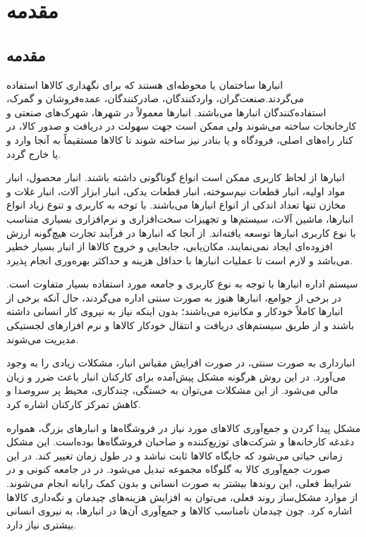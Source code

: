 \chapter{مقدمه}
\section{مقدمه}
انبارها ساختمان یا محوطه‌ای هستند که برای نگهداری کالاها استفاده می‌گردند.صنعت‌گران، واردکنندگان، صادرکنندگان، عمده‌فروشان و گمرک، استفاده‌کنندگان انبارها می‌باشند. انبارها معمولاً در شهرها، شهرک‌های صنعتی و کارخانجات ساخته می‌شوند ولی ممکن است جهت سهولت در دریافت و صدور کالا، در کنار راه‌های اصلی، فرودگاه و یا بنادر نیز ساخته شوند تا کالاها مستقیماً به آنجا وارد و یا خارج گردد.

انبار‌ها از لحاظ کاربری ممکن است انواع گوناگونی داشته باشند. انبار محصول، انبار مواد اولیه، انبار قطعات نیم‌سوخته، انبار قطعات یدکی، انبار ابزار آلات، انبار غلات و مخازن تنها تعداد اندکی از انواع انبارها می‌باشند. با توجه به کاربری و تنوع زیاد انواع انبارها، ماشین آلات، سیستم‌ها و تجهیزات سخت‌افزاری و نرم‌افزاری بسیاری متناسب با نوع کاربری انبارها توسعه یافته‌اند. از آنجا که انبارها در فرآیند تجارت هیچ‌گونه ارزش افزوده‌ای ایجاد نمی‌نمایند، مکان‌یابی، جابجایی و خروج کالاها از انبار بسیار خطیر می‌باشد و لازم است تا عملیات انبارها با حداقل هزینه و حداکثر بهره‌وری انجام پذیرد.

سیستم اداره انبارها با توجه به نوع کاربری و جامعه مورد استفاده بسیار متفاوت است. در برخی از جوامع، انبارها هنوز به صورت سنتی اداره می‌گردند، حال آنکه برخی از انبارها کاملاً خودکار و مکانیزه می‌باشند؛ بدون اینکه نیاز به نیروی کار انسانی داشته باشند و از طریق سیستم‌های دریافت و انتقال خودکار کالاها و نرم افزارهای لجستیکی مدیریت می‌شوند.

انبارداری به صورت سنتی، در صورت افزایش مقیاس انبار، مشکلات زیادی را به وجود می‌آورد. در این روش هرگونه مشکل پیش‌آمده برای کارکنان انبار باعث ضرر و زیان مالی می‌شود. از این مشکلات می‌توان به خستگی، چندکاری، محیط پر سروصدا و کاهش تمرکز کارکنان اشاره کرد.
 
 
مشکل پیدا کردن و جمع‌آوری کالاهای مورد نیاز در فروشگاه‌ها و انبارهای بزرگ، همواره دغدغه کارخانه‌ها و شرکت‌های توزیع‌کننده و صاحبان فروشگاه‌ها بوده‌است. این مشکل زمانی حیاتی می‌شود که جایگاه کالاها ثابت نباشد و در طول زمان تغییر کند. در این صورت جمع‌آوری کالا به گلوگاه مجموعه تبدیل می‌شود. در در جامعه کنونی و در شرایط فعلی، این روندها بیشتر به صورت انسانی و بدون کمک رایانه انجام می‌شوند. از موارد مشکل‌ساز روند فعلی، می‌توان به افزایش هزینه‌های چیدمان و نگه‌داری کالاها اشاره کرد. چون چیدمان نامناسب کالاها و جمع‌آوری آن‌ها در انبارها، به نیروی انسانی بیشتری نیاز دارد.
 
